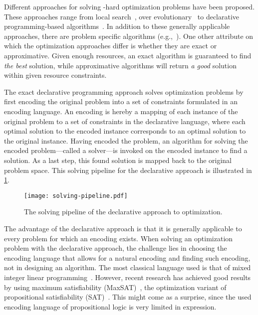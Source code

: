 Different approaches for solving \NP-hard optimization problems have been proposed.
These approaches range from local search~\autocite{DBLP:books/daglib/0017492}, over evolutionary~\autocites{DBLP:books/daglib/0087893,DBLP:journals/jgo/StornP97} to declarative programming-based algorithms~\autocite{handbook2-maxsat,ChenEtAl2010-intro,DBLP:reference/fai/2}.
In addition to these generally applicable approaches, there are problem specific algorithms (e.g.,~\autocite{DBLP:conf/aaai/DemirovicS21,DBLP:conf/kdd/NijssenF07,DBLP:conf/nips/HuRS19}).
One other attribute on which the optimization approaches differ is whether they are exact or approximative.
Given enough resources, an exact algorithm is guaranteed to find \emph{the best} solution, while approximative algorithms will return \emph{a good} solution within given resource constraints.

The exact declarative programming approach solves optimization problems by first encoding the original problem into a set of constraints formulated in an encoding language.
An encoding is hereby a mapping of each instance of the original problem to a set of constraints in the declarative language, where each optimal solution to the encoded instance corresponds to an optimal solution to the original instance.
Having encoded the problem, an algorithm for solving the encoded problem---called a solver---is invoked on the encoded instance to find a solution.
As a last step, this found solution is mapped back to the original problem space.
This solving pipeline for the declarative approach is illustrated in \cref{fig:solving-pipeline}.

\begin{figure}
  \centering
  \texttt{[image: solving-pipeline.pdf]}
  \caption{The solving pipeline of the declarative approach to optimization.}\label{fig:solving-pipeline}
\end{figure}

The advantage of the declarative approach is that it is generally applicable to every problem for which an encoding exists.
When solving an optimization problem with the declarative approach, the challenge lies in choosing the encoding language that allows for a natural encoding and finding such encoding, not in designing an algorithm.
The most classical language used is that of mixed integer linear programming~\autocites{ChenEtAl2010-intro,KorteVygen2018-5}.
However, recent research has achieved good results by using maximum satisfiability (MaxSAT)~\autocite{handbook2-maxsat}, the optimization variant of propositional satisfiability (SAT)~\autocite{handbook2-sat}.
This might come as a surprise, since the used encoding language of propositional logic is very limited in expression.

